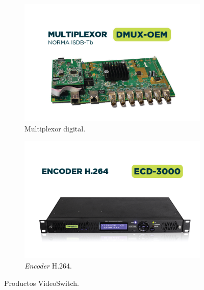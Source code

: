   \vspace{1cm}
  \begin{figure}[htbp]
    \centering
    \begin{subfigure}{0.9\linewidth}
      \includegraphics[width=\linewidth]{./Figures/DMUX-OEM.jpg}
      \caption{Multiplexor digital.}
    \end{subfigure}
    \hspace{.05\linewidth}
    \begin{subfigure}{0.9\linewidth}
      \includegraphics[width=\linewidth]{./Figures/ECD-3000.png}
      \caption{\textit{Encoder} H.264.}
    \end{subfigure}
    \caption{Productos VideoSwitch.}\label{fig:vs-mux-ecd}
  \end{figure}
  \vspace{1cm}